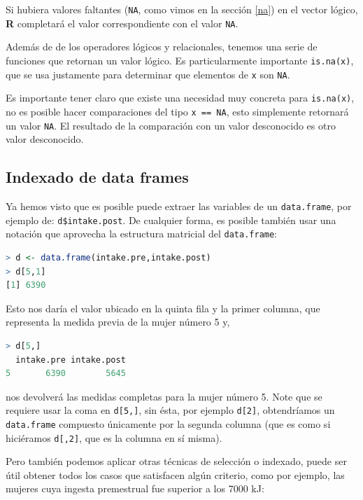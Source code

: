 Si hubiera valores faltantes (\texttt{NA}, como vimos en la sección \ref{na})
en el vector lógico, \textbf{R} completará el valor correspondiente con el
valor \texttt{NA}.

Además de de los operadores lógicos y relacionales, tenemos una serie de
funciones que retornan un valor lógico. Es particularmente importante
\texttt{is.na(x)}, que se usa justamente para determinar que elementos de
\texttt{x} son \texttt{NA}.

Es importante tener claro que existe una necesidad muy concreta para
\texttt{is.na(x)}, no es posible hacer comparaciones del tipo \texttt{x == NA},
esto simplemente retornará un valor \texttt{NA}. El resultado de la comparación
con un valor desconocido es otro valor desconocido.

\subsection{Indexado de data frames}

Ya hemos visto que es posible puede extraer las variables de un
\texttt{data.frame}, por ejemplo de: \texttt{d\$intake.post}. De cualquier forma,
es posible también usar una notación que aprovecha la estructura matricial del
\texttt{data.frame}:

\begin{lstlisting}[language=R]
> d <- data.frame(intake.pre,intake.post)
> d[5,1]
[1] 6390
\end{lstlisting}

Esto nos daría el valor ubicado en la quinta fila y la primer columna, que
representa la medida previa de la mujer número 5 y,

\begin{lstlisting}[language=R]
> d[5,]
  intake.pre intake.post
5       6390        5645
\end{lstlisting}

nos devolverá las medidas completas para la mujer número 5. Note que se
requiere usar la coma en \texttt{d[5,]}, sin ésta, por ejemplo \texttt{d[2]},
obtendríamos un \texttt{data.frame} compuesto únicamente por la segunda columna
(que es como si hiciéramos \texttt{d[,2]}, que es la columna en sí misma).

Pero también podemos aplicar otras técnicas de selección o indexado, puede ser
útil obtener todos los casos que satisfacen algún criterio, como por ejemplo,
las mujeres cuya ingesta premestrual fue superior a los 7000 kJ:

